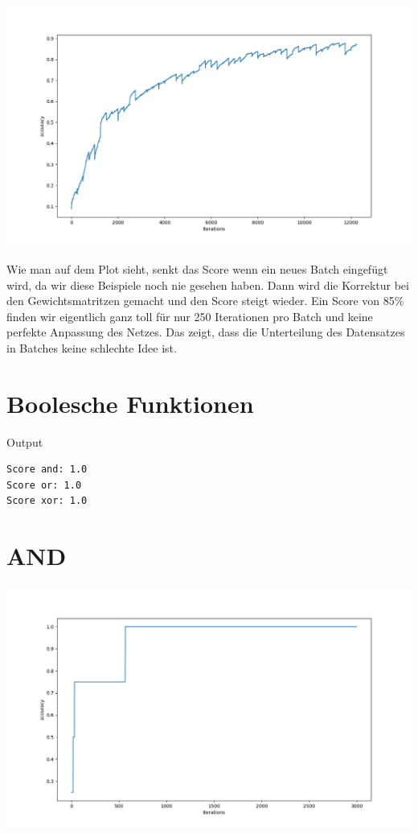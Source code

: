 \includegraphics[height=8cm]{./20_inner_big.png}

Wie man auf dem Plot sieht, senkt das Score wenn ein neues Batch eingefügt wird, da wir diese Beispiele noch nie
gesehen haben. Dann wird die Korrektur bei den Gewichtsmatritzen gemacht und den Score steigt wieder.
Ein Score von 85\% finden wir eigentlich ganz toll für nur 250 Iterationen pro Batch und keine
perfekte Anpassung des Netzes. Das zeigt, dass die Unterteilung
des Datensatzes in Batches keine schlechte Idee ist.

\section*{Boolesche Funktionen}

Output
\begin{lstlisting}
Score and: 1.0
Score or: 1.0
Score xor: 1.0

\end{lstlisting}

\section*{AND}

\includegraphics[height=8cm]{./nn_and.png}

